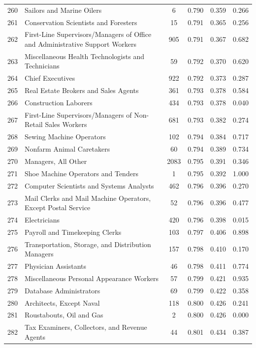 {\begin{longtable}{llcccc}
 260 & Sailors and Marine Oilers & 6 & 0.790 & 0.359 & 0.266 \\
 261 & Conservation Scientists and Foresters & 15 & 0.791 & 0.365 & 0.256 \\
 262 & First-Line Supervisors/Managers of Office and Administrative Support Workers & 905 & 0.791 & 0.367 & 0.682 \\
 263 & Miscellaneous Health Technologists and Technicians & 59 & 0.792 & 0.370 & 0.620 \\
 264 & Chief Executives & 922 & 0.792 & 0.373 & 0.287 \\
 265 & Real Estate Brokers and Sales Agents & 361 & 0.793 & 0.378 & 0.584 \\
 266 & Construction Laborers & 434 & 0.793 & 0.378 & 0.040 \\
 267 & First-Line Supervisors/Managers of Non-Retail Sales Workers & 681 & 0.793 & 0.382 & 0.274 \\
 268 & Sewing Machine Operators & 102 & 0.794 & 0.384 & 0.717 \\
 269 & Nonfarm Animal Caretakers & 60 & 0.794 & 0.389 & 0.734 \\
 270 & Managers, All Other & 2083 & 0.795 & 0.391 & 0.346 \\
 271 & Shoe Machine Operators and Tenders & 1 & 0.795 & 0.392 & 1.000 \\
 272 & Computer Scientists and Systems Analysts & 462 & 0.796 & 0.396 & 0.270 \\
 273 & Mail Clerks and Mail Machine Operators, Except Postal Service & 52 & 0.796 & 0.396 & 0.477 \\
 274 & Electricians & 420 & 0.796 & 0.398 & 0.015 \\
 275 & Payroll and Timekeeping Clerks & 103 & 0.797 & 0.406 & 0.898 \\
 276 & Transportation, Storage, and Distribution Managers & 157 & 0.798 & 0.410 & 0.170 \\
 277 & Physician Assistants & 46 & 0.798 & 0.411 & 0.774 \\
 278 & Miscellaneous Personal Appearance Workers & 57 & 0.799 & 0.421 & 0.935 \\
 279 & Database Administrators & 69 & 0.799 & 0.422 & 0.358 \\
 280 & Architects, Except Naval & 118 & 0.800 & 0.426 & 0.241 \\
 281 & Roustabouts, Oil and Gas & 2 & 0.800 & 0.426 & 0.000 \\
 282 & Tax Examiners, Collectors, and Revenue Agents & 44 & 0.801 & 0.434 & 0.387 \\

\end{longtable}}
